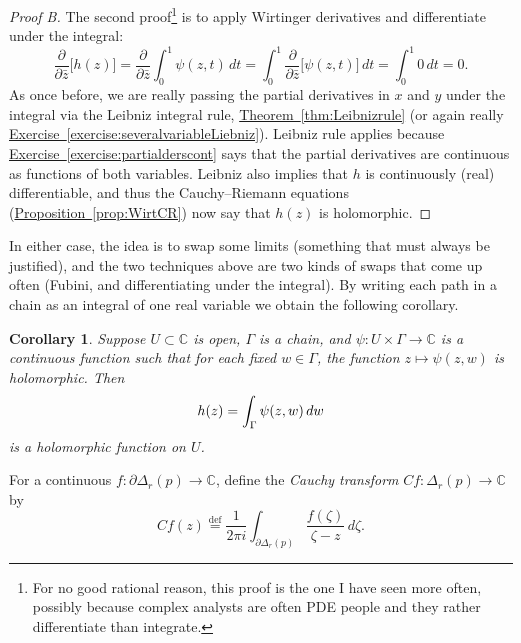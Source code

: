 \documentclass[12pt,openany]{book}
\newcommand{\avoidbreak}{\postdisplaypenalty=100}
\newcommand{\C}{{\mathbb{C}}}
\newcommand{\myindex}[1]{#1\index{#1}}
\theoremstyle{plain}
\newtheorem{cor}[thm]{Corollary}
\theoremstyle{remark}
\theoremstyle{definition}
\theoremstyle{exercise}
\theoremstyle{example}
\newcommand{\exerciseref}[1]{\hyperref[#1]{Exercise~\ref*{#1}}}
\newcommand{\thmref}[1]{\hyperref[#1]{Theorem~\ref*{#1}}}
\newcommand{\propref}[1]{\hyperref[#1]{Proposition~\ref*{#1}}}
\begin{document}
\begin{proof}[Proof B]
The second proof\footnote{%
For no good rational reason, this proof is the one I have seen more often,
possibly because complex analysts are often PDE
people and they rather differentiate than integrate.}
is to apply Wirtinger derivatives and differentiate under the integral:
\begin{equation*}
\frac{\partial}{\partial \bar{z}}
\bigl[
h(z)
\bigr]
=
\frac{\partial}{\partial \bar{z}}
\int_0^1 \psi(z,t) \, dt
=
\int_0^1
\frac{\partial}{\partial \bar{z}}
\bigl[
\psi(z,t)
\bigr]
\, dt
= \int_0^1 0 \, dt = 0.
\end{equation*}
As once before, we are really passing the partial derivatives in $x$
and $y$ under the integral via the Leibniz integral rule,
\thmref{thm:Leibnizrule} (or again really
\exerciseref{exercise:severalvariableLiebniz}).
Leibniz rule applies because 
\exerciseref{exercise:partialderscont} says that the partial
derivatives are continuous as functions of both variables.
Leibniz also implies that $h$ is continuously (real) differentiable,
and thus
the Cauchy--Riemann equations
(\propref{prop:WirtCR}) now
say that $h(z)$ is holomorphic.
\end{proof}

In either case, the idea is to swap some limits (something that must always
be justified),
and the two techniques above are two kinds of swaps that come up
often (Fubini, and differentiating under the integral).  By writing each
path in a chain as an integral of one real variable we obtain the following
corollary.

\begin{cor} \label{cor:holfuncbyintegral}
Suppose $U \subset \C$ is open, $\Gamma$ is a 
chain,
and
$\psi \colon U \times \Gamma \to \C$ is a continuous function such that
for each fixed $w \in \Gamma$, the function $z \mapsto \psi(z,w)$ is
holomorphic.  Then
\begin{equation*}
h(z) =
\int_\Gamma \psi(z,w) \, dw
\avoidbreak
\end{equation*}
is a holomorphic function on $U$.
\end{cor}

For a continuous $f \colon \partial \Delta_r(p) \to \C$, define
the \emph{\myindex{Cauchy transform}} $Cf \colon \Delta_r(p) \to \C$ by
%
\begin{equation*}
Cf(z)
\overset{\text{def}}{=}
\frac{1}{2\pi i}
\int_{\partial \Delta_r(p)}
\frac{f(\zeta)}{\zeta-z}\, d\zeta .
\end{equation*}
\end{document}
